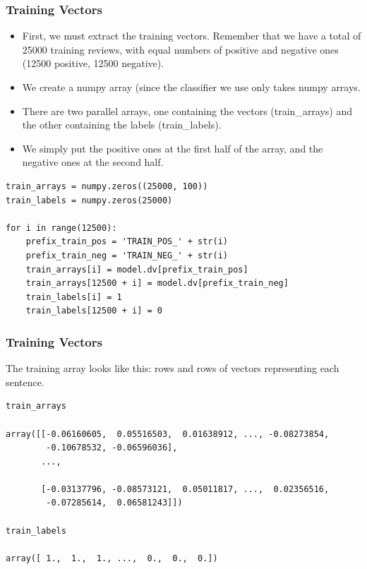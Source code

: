 \begin{frame}[fragile]\frametitle{Training Vectors}
\begin{itemize}
\item First, we must extract the training vectors. Remember that we have a total of 25000 training reviews, with equal numbers of positive and negative ones (12500 positive, 12500 negative).
\item We create a numpy array (since the classifier we use only takes numpy arrays. 
\item There are two parallel arrays, one containing the vectors (train\_arrays) and the other containing the labels (train\_labels).
\item We simply put the positive ones at the first half of the array, and the negative ones at the second half.
\end{itemize}
\begin{lstlisting}
train_arrays = numpy.zeros((25000, 100))
train_labels = numpy.zeros(25000)

for i in range(12500):
    prefix_train_pos = 'TRAIN_POS_' + str(i)
    prefix_train_neg = 'TRAIN_NEG_' + str(i)
    train_arrays[i] = model.dv[prefix_train_pos]
    train_arrays[12500 + i] = model.dv[prefix_train_neg]
    train_labels[i] = 1
    train_labels[12500 + i] = 0
\end{lstlisting}
\end{frame}


\begin{frame}[fragile]\frametitle{Training Vectors}
The training array looks like this: rows and rows of vectors representing each sentence.
\begin{lstlisting}
train_arrays

array([[-0.06160605,  0.05516503,  0.01638912, ..., -0.08273854,
        -0.10678532, -0.06596036],
       ..., 

       [-0.03137796, -0.08573121,  0.05011817, ...,  0.02356516,
        -0.07285614,  0.06581243]])
		
train_labels

array([ 1.,  1.,  1., ...,  0.,  0.,  0.])
\end{lstlisting}
\end{frame}

